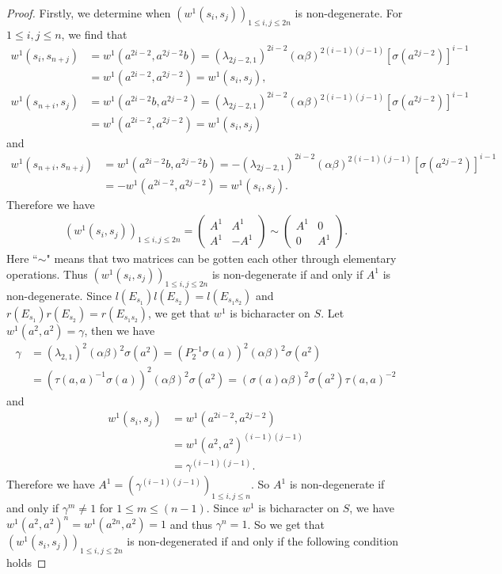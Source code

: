 \documentclass[a4paper,11pt]{amsart}
\numberwithin{equation}{section}
\begin{document}
\begin{proof}
Firstly, we determine when $(w^1(s_i,s_j))_{1\leq i,j \leq 2n}$ is non-degenerate. For $1\leq i,j \leq n$, we find that
\begin{align*}
w^1(s_i,s_{n+j})&=w^1(a^{2i-2},a^{2j-2}b)=(\lambda_{2j-2,1})^{2i-2} (\alpha \beta)^{2(i-1)(j-1)}[\sigma(a^{2j-2})]^{i-1}\\
&=w^1(a^{2i-2},a^{2j-2})=w^1(s_i,s_j),\\
w^1(s_{n+i},s_{j})&=w^1(a^{2i-2}b,a^{2j-2})=(\lambda_{2j-2,1})^{2i-2} (\alpha \beta)^{2(i-1)(j-1)}[\sigma(a^{2j-2})]^{i-1}\\
&=w^1(a^{2i-2},a^{2j-2})=w^1(s_i,s_j)
\end{align*}
and
\begin{align*}
w^1(s_{n+i},s_{n+j})&=w^1(a^{2i-2}b,a^{2j-2}b)=-(\lambda_{2j-2,1})^{2i-2} (\alpha \beta)^{2(i-1)(j-1)}[\sigma(a^{2j-2})]^{i-1}\\
&=-w^1(a^{2i-2},a^{2j-2})=w^1(s_i,s_j).
\end{align*}
Therefore we have
\begin{gather*}
(w^1(s_i,s_j))_{1\leq i,j \leq 2n} = \begin{pmatrix} A^1 & A^1 \\ A^1 & -A^1 \end{pmatrix} \sim \begin{pmatrix} A^1 & 0 \\ 0 & A^1 \end{pmatrix}.
\end{gather*} Here ``$\sim$" means that two matrices can be gotten each other through elementary operations. Thus $(w^1(s_i,s_j))_{1\leq i,j \leq 2n}$ is non-degenerate if and only if $A^1$ is non-degenerate. Since $l(E_{s_1}) l(E_{s_2})=l(E_{s_1s_2})$ and $r(E_{s_1}) r(E_{s_2})=r(E_{s_1s_2})$, we get that $w^1$ is bicharacter on $S$. Let $w^1(a^2,a^2)=\gamma$, then we have
\begin{align*}
\gamma&=(\lambda_{2,1})^2 (\alpha \beta)^2 \sigma(a^2)=(P_{2}^{-1} \sigma(a))^2 (\alpha \beta)^2 \sigma(a^2)\\
&=(\tau(a,a)^{-1} \sigma(a))^2 (\alpha \beta)^2 \sigma(a^2)=(\sigma(a) \alpha \beta)^2 \sigma(a^2) \tau(a,a)^{-2}
\end{align*}
and
\begin{align*}
w^1(s_i,s_j)&=w^1(a^{2i-2},a^{2j-2})\\
&=w^1(a^2,a^2)^{(i-1)(j-1)}\\
&=\gamma^{(i-1)(j-1)}.
\end{align*}
Therefore we have $A^1=(\gamma^{(i-1)(j-1)})_{1\leq i,j \leq n}$. So $A^1$ is non-degenerate if and only if $\gamma^m\neq 1$ for $1\leq m \leq (n-1)$. Since $w^1$ is bicharacter on $S$, we have $w^1(a^2,a^2)^n=w^1(a^{2n},a^2)=1$ and thus $\gamma^n=1$. So we get that  $(w^1(s_i,s_j))_{1\leq i,j \leq 2n}$ is non-degenerated if and only if the following condition holds

\end{proof}
\end{document}
